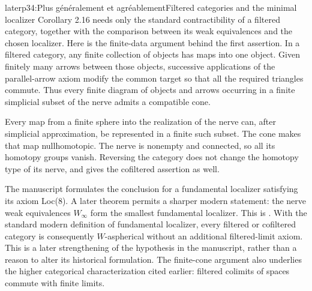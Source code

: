 \begin{dcomment}{later}{p34:Plus généralement et agréablement}{Filtered categories and the minimal localizer}
Corollary 2.16 needs only the standard contractibility of a filtered category, together with the comparison between its weak equivalences and the chosen localizer. Here is the finite-data argument behind the first assertion. In a filtered category, any finite collection of objects has maps into one object. Given finitely many arrows between those objects, successive applications of the parallel-arrow axiom modify the common target so that all the required triangles commute. Thus every finite diagram of objects and arrows occurring in a finite simplicial subset of the nerve admits a compatible cone.

Every map from a finite sphere into the realization of the nerve can, after simplicial approximation, be represented in a finite such subset. The cone makes that map nullhomotopic. The nerve is nonempty and connected, so all its homotopy groups vanish. Reversing the category does not change the homotopy type of its nerve, and gives the cofiltered assertion as well.

The manuscript formulates the conclusion for a fundamental localizer satisfying its axiom Loc(8). A later theorem permits a sharper modern statement: the nerve weak equivalences $W_\infty$ form the smallest fundamental localizer. This is \citet[Theorem 2.2.11, p.~136]{Cisinski2004Minimal}. With the standard modern definition of fundamental localizer, every filtered or cofiltered category is consequently $W$-aspherical without an additional filtered-limit axiom. This is a later strengthening of the hypothesis in the manuscript, rather than a reason to alter its historical formulation. The finite-cone argument also underlies the higher categorical characterization cited earlier: filtered colimits of spaces commute with finite limits.
\end{dcomment}

